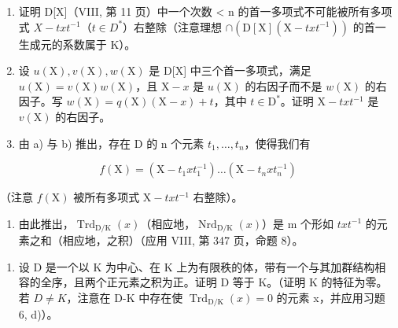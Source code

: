 \begin{enumerate}
\def\labelenumi{\alph{enumi})}
\item
  证明 D{[}X{]}（VIII, 第 11 页）中一个次数 \textless{} n 的首一多项式不可能被所有多项式 \(X - txt^{-1}\)（\(t \in D^{*}\)）右整除（注意理想 \(\cap(\mathrm{D}[\mathrm{X}](\mathrm{X}-txt^{-1}))\) 的首一生成元的系数属于 K）。
\item
  设 \(u(\mathrm{X}), v(\mathrm{X}), w(\mathrm{X})\) 是 D{[}X{]} 中三个首一多项式，满足 \(u(\mathrm{X}) = v(\mathrm{X})w(\mathrm{X})\)，且 \(\mathrm{X} - x\) 是 \(u(\mathrm{X})\) 的右因子而不是 \(w(\mathrm{X})\) 的右因子。写 \(w(\mathrm{X}) = q(\mathrm{X})(\mathrm{X} - x) + t\)，其中 \(t \in \mathrm{D}^*\)。证明 \(\mathrm{X} - txt^{-1}\) 是 \(v(\mathrm{X})\) 的右因子。
\item
  由 a) 与 b) 推出，存在 D 的 n 个元素 \(t_{1},\ldots,t_{n}\)，使得我们有
\end{enumerate}

\[
f (\mathrm{X}) = \left(\mathrm{X} - t _ {1} x t _ {1} ^ {- 1}\right) \dots \left(\mathrm{X} - t _ {n} x t _ {n} ^ {- 1}\right)
\]

（注意 \(f(\mathrm{X})\) 被所有多项式 \(\mathrm{X} - txt^{-1}\) 右整除）。

\begin{enumerate}
\def\labelenumi{\alph{enumi})}
\setcounter{enumi}{3}
\tightlist
\item
  由此推出，\(\operatorname{Trd}_{\mathrm{D}/\mathrm{K}}(x)\)（相应地，\(\operatorname{Nrd}_{\mathrm{D}/\mathrm{K}}(x)\)）是 m 个形如 \(txt^{-1}\) 的元素之和（相应地，之积）（应用 VIII, 第 347 页，命题 8）。
\end{enumerate}

\begin{enumerate}
\def\labelenumi{\arabic{enumi})}
\setcounter{enumi}{6}
\tightlist
\item
  设 D 是一个以 K 为中心、在 K 上为有限秩的体，带有一个与其加群结构相容的全序，且两个正元素之积为正。证明 D 等于 K。（证明 K 的特征为零。若 \(D \neq K\)，注意在 D-K 中存在使 \(\operatorname{Trd}_{\mathrm{D}/\mathrm{K}}(x) = 0\) 的元素 x，并应用习题 6, d)）。
\end{enumerate}


